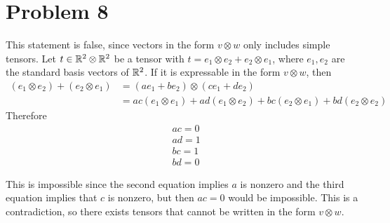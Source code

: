 \section*{Problem 8}
This statement is false, since vectors in the form $v \otimes w$
only includes simple tensors.
Let $t \in \mathbb{R}^2 \otimes \mathbb{R}^2$ be a tensor with 
$t = e_1 \otimes e_2 + e_2 \otimes e_1$, where $e_1,e_2$ 
are the standard basis vectors of $\mathbb{R}^2$.
If it is expressable in the form $v \otimes w$,
then
\begin{align*}
    (e_1 \otimes e_2) + (e_2 \otimes e_1)
    &= (ae_1 + be_2) \otimes (ce_1 + de_2)\\
    &= ac(e_1 \otimes e_1) + ad(e_1 \otimes e_2) 
    + bc(e_2 \otimes e_1) + bd(e_2 \otimes e_2)
\end{align*}
Therefore
\begin{align*}
    & ac = 0\\
    & ad = 1\\
    & bc = 1\\
    & bd = 0
\end{align*}

This is impossible since the second equation implies $a$ is nonzero
and the third equation implies that $c$ is nonzero,
but then $ac = 0$ would be impossible.
This is a contradiction, so there exists tensors that cannot be 
written in the form $v \otimes w$.
